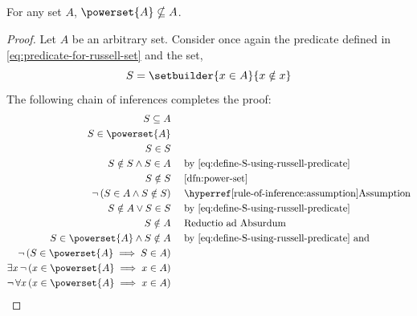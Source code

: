\begin{thm}
    \label{thm:power-set-of-A-can-never-be-subset-of-A}
    For any set \( A \), \( \powerset{A} \nsubseteq A \).
\end{thm}

\begin{proof}
    Let \( A \) be an arbitrary set. Consider once again the predicate
    defined in \eqref{eq:predicate-for-russell-set} and the set,
    \begin{equation}
        \label{eq:define-S-using-russell-predicate}
        S = \setbuilder{x \in A}{x \notin x}
    \end{equation}
    The following chain of inferences completes the proof:
    \begin{equation*}
        \begin{aligned}
            S \subseteq A& \\
            S \in \powerset{A}& \\
            S \in S& \\
            S \notin S \land S \in A& \\
            S \notin S& \\
            \lnot \, \mleft(S \in A \land S \notin S\mright)& \\
            S \notin A \lor S \in S& \\
            S \notin A& \\
            S \in \powerset{A} \land S \notin A& \\
            \lnot \, \mleft( S \in \powerset{A} \implies S \in A \mright)& \\
            \exists x \, \lnot \, \mleft( x \in \powerset{A} \implies x \in A \mright)& \\
            \lnot \, \forall x \, \mleft( x \in \powerset{A} \implies x \in A \mright)&
        \end{aligned}
        \text{  }
        \begin{aligned}
            &\quad\text{by \eqref{eq:define-S-using-russell-predicate}} \\
            &\quad\text{\cref{dfn:power-set}} \\
            &\quad\text{\aref{rule-of-inference:assumption}{Assumption}} \\
            &\quad\text{by \eqref{eq:define-S-using-russell-predicate}}\\
            &\quad\text{Reductio ad Absurdum}\\
            &\quad\text{by \eqref{eq:define-S-using-russell-predicate} and
}
\end{aligned}
\end{equation*}
\end{proof}
